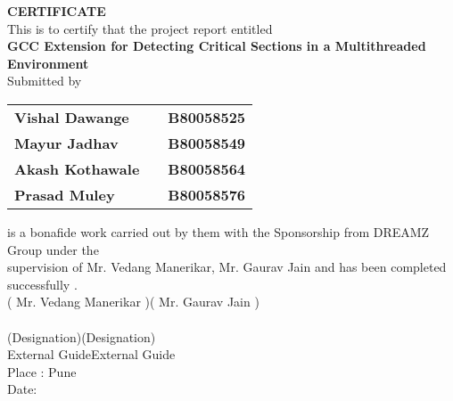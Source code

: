 \begin{center}
\thispagestyle{empty}
\vspace*{4\baselineskip}
\LARGE{\textbf{CERTIFICATE}}\\[1.0cm]
\large{This is to certify that the project report entitled}\\[0.7cm]
\Large{\textbf{GCC Extension for Detecting Critical Sections in a Multithreaded Environment}}\\[0.7cm]
\normalsize{Submitted by}\\[0.3cm]
\end{center}
\begin{table}[h]\large
\centering
\begin{tabular}{>{\bfseries}lc>{\bfseries}r}
 Vishal Dawange & & B80058525\\ %
 Mayur Jadhav & & B80058549\\ %
 Akash Kothawale & & B80058564\\ %
 Prasad Muley & & B80058576\\ %
\end{tabular}
\end{table}
\normalsize{is a bonafide work carried out by them with the Sponsorship from DREAMZ Group under the
\\supervision of Mr. Vedang Manerikar, Mr. Gaurav Jain and has been completed successfully .}\\[1.5cm]
\normalsize{( Mr. Vedang Manerikar )}\hspace*{2.8in}\normalsize{( Mr. Gaurav Jain )}\\[0.3cm]\\
\normalsize{(Designation)}\hspace*{3.6in}\normalsize{(Designation)}\\
\normalsize{External Guide}\hspace*{3.5in}\normalsize{External Guide}\\[1cm]
\normalsize{Place : Pune}\\
\normalsize{Date:}\\
\newpage
